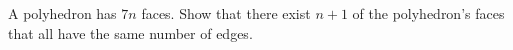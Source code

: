 A polyhedron has $7n$ faces. Show that there exist $n + 1$ of the polyhedron's faces that all have the same number of edges.